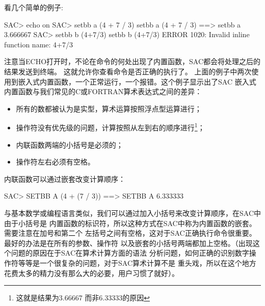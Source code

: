 看几个简单的例子:
\begin{SACCode}
SAC> echo on
SAC> setbb a (4 + 7 / 3)
 setbb a (4 + 7 / 3)
 ==> setbb a 3.666667
SAC> setbb b (4+7/3)
 setbb b (4+7/3)
 ERROR 1020: Invalid inline function name: 4+7/3
\end{SACCode}
注意当ECHO打开时，不论在命令的何处出现了内置函数，SAC都会将处理之后的结果发送到终端。
这就允许你查看命令是否正确的执行了。
上面的例子中两次使用到嵌入式内置函数，一个正常运行，一个报错。这个例子显示出了SAC
嵌入式内置函数与我们常见的C或FORTRAN算术表达式之间的差异：
\begin{itemize}
\renewcommand\labelitemi{\dag}	%
\item 所有的数都被认为是实型，算术运算按照浮点型运算进行；
\item 操作符没有优先级的问题，计算按照从左到右的顺序进行\footnote{这就是结果为3.66667
	而非6.33333的原因}；
\item 内联函数两端的小括号是必须的；
\item 操作符左右必须有空格。
\end{itemize}
内联函数可以通过嵌套改变计算顺序：
\begin{SACCode}
SAC> SETBB A (4 + (7 / 3))
 ==> SETBB A 6.333333
\end{SACCode}
与基本数学或编程语言类似，我们可以通过加入小括号来改变计算顺序，在SAC中由于小括号是
内置函数的标识符，所以这种方式在SAC中称为内置函数的嵌套。需要注意在加号和第二个
左括号之间有空格，这对于SAC正确执行命令很重要。最好的办法是在所有的参数、操作符
以及嵌套的小括号两端都加上空格。（出现这个问题的原因在于SAC在算术计算方面的语法
分析问题，如何正确的识别数字操作符等等是一个很复杂的问题，对于SAC算术计算不是
重头戏，所以在这个地方花费太多的精力没有那么大的必要，用户习惯了就好）。

